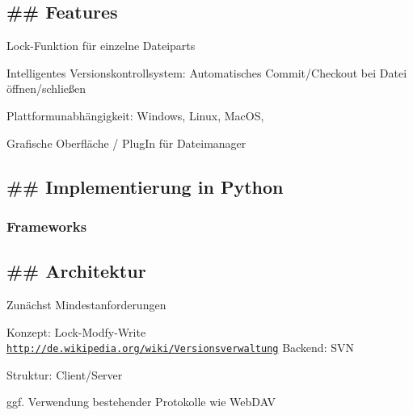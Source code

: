 \subsection*{\#\# Features }


\begin{DoxyItemize}
\item Lock-\/\-Funktion für einzelne Dateiparts
\item Intelligentes Versionskontrollsystem\-: Automatisches Commit/\-Checkout bei Datei öffnen/schließen
\item Plattformunabhängigkeit\-: Windows, Linux, Mac\-O\-S,
\item Grafische Oberfläche / Plug\-In für Dateimanager
\end{DoxyItemize}

\subsection*{\#\# Implementierung in Python }

\subsubsection*{Frameworks}

\subsection*{\#\# Architektur }

Zunächst Mindestanforderungen
\begin{DoxyItemize}
\item Konzept\-: Lock-\/\-Modfy-\/\-Write \href{http://de.wikipedia.org/wiki/Versionsverwaltung}{\tt http\-://de.\-wikipedia.\-org/wiki/\-Versionsverwaltung} Backend\-: S\-V\-N
\item Struktur\-: Client/\-Server
\item ggf. Verwendung bestehender Protokolle wie Web\-D\-A\-V 
\end{DoxyItemize}